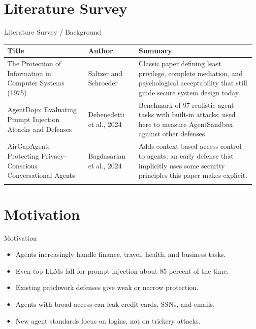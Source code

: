 \documentclass[10pt]{beamer}
\begin{document}
\section{Literature Survey}
\begin{frame}{Literature Survey / Background}
  \small
  \begin{tabular}{@{}p{2.7cm}p{2.3cm}p{5.6cm}@{}}
    \toprule
    \textbf{Title} & \textbf{Author} & \textbf{Summary} \\
    \midrule
    The Protection of Information in Computer Systems (1975) & Saltzer and Schroeder & Classic paper defining least privilege, complete mediation, and psychological acceptability that still guide secure system design today. \\
    \addlinespace
    AgentDojo: Evaluating Prompt Injection Attacks and Defenses & Debenedetti et al., 2024 & Benchmark of 97 realistic agent tasks with built-in attacks; used here to measure AgentSandbox against other defenses. \\
    \addlinespace
    AirGapAgent: Protecting Privacy-Conscious Conversational Agents & Bagdasarian et al., 2024 & Adds context-based access control to agents; an early defense that implicitly uses some security principles this paper makes explicit. \\
    \addlinespace
    \bottomrule
  \end{tabular}
\end{frame}
\section{Motivation}
\begin{frame}{Motivation}
\begin{itemize}
  \item Agents increasingly handle finance, travel, health, and business tasks.
  \item Even top LLMs fall for prompt injection about 85 percent of the time.
  \item Existing patchwork defenses give weak or narrow protection.
  \item Agents with broad access can leak credit cards, SSNs, and emails.
  \item New agent standards focus on logins, not on trickery attacks.
\end{itemize}
\end{frame}
\end{document}
